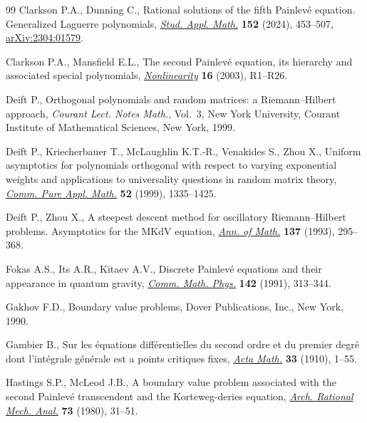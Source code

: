 \documentclass[pdftex]{sigma}
\numberwithin{equation}{section}
\theoremstyle{definition}
\begin{document}
\begin{thebibliography}{99}
Clarkson P.A., Dunning C., Rational solutions of the fifth {P}ainlev\'e
 equation. {G}eneralized {L}aguerre polynomials,
 \href{https://doi.org/10.1111/sapm.12649}{\textit{Stud. Appl. Math.}}
 \textbf{152} (2024), 453--507,
 \href{http://arxiv.org/abs/2304:01579}{arXiv:2304:01579}.

Clarkson P.A., Mansfield E.L., The second {P}ainlev\'e equation, its hierarchy
 and associated special polynomials,
 \href{https://doi.org/10.1088/0951-7715/16/3/201}{\textit{Nonlinearity}}
 \textbf{16} (2003), R1--R26.

Deift P., Orthogonal polynomials and random matrices: a {R}iemann--{H}ilbert
 approach, \textit{Courant Lect. Notes Math.}, Vol.~3, New York University,
 Courant Institute of Mathematical Sciences, New York, 1999.

Deift P., Kriecherbauer T., McLaughlin K.T.-R., Venakides S., Zhou X., Uniform
 asymptotics for polynomials orthogonal with respect to varying exponential
 weights and applications to universality questions in random matrix theory,
 \href{https://doi.org/10.1002/(SICI)1097-0312(199911)52:11<1335::AID-CPA1>3.0.CO;2-1}{\textit{Comm.
 Pure Appl. Math.}} \textbf{52} (1999), 1335--1425.

Deift P., Zhou X., A steepest descent method for oscillatory
 {R}iemann--{H}ilbert problems. {A}symptotics for the {MK}d{V} equation,
 \href{https://doi.org/10.2307/2946540}{\textit{Ann. of Math.}} \textbf{137}
 (1993), 295--368.

Fokas A.S., Its A.R., Kitaev A.V., Discrete {P}ainlev\'e equations and their
 appearance in quantum gravity,
 \href{https://doi.org/10.1007/BF02102066}{\textit{Comm. Math. Phys.}}
 \textbf{142} (1991), 313--344.

Gakhov F.D., Boundary value problems, Dover Publications, Inc., New York, 1990.

Gambier B., Sur les \'equations diff\'erentielles du second ordre et du premier
 degr\'e dont l'int\'egrale g\'en\'erale est a points critiques fixes,
 \href{https://doi.org/10.1007/BF02393211}{\textit{Acta Math.}} \textbf{33}
 (1910), 1--55.

Hastings S.P., McLeod J.B., A boundary value problem associated with the second
 {P}ainlev\'e transcendent and the {K}orteweg-deries equation,
 \href{https://doi.org/10.1007/BF00283254}{\textit{Arch. Rational Mech.
 Anal.}} \textbf{73} (1980), 31--51.


\end{thebibliography}
\end{document}
